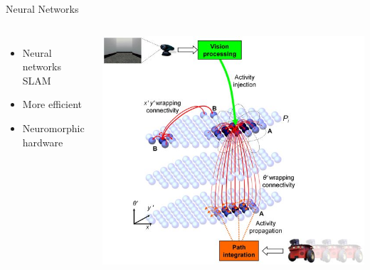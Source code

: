 \documentclass[17pt,mathserif]{beamer}
\begin{document}
        
    \begin{frame}{Neural Networks}{}
      \vspace*{-3em}        
      \begin{columns}
        \begin{itemize}
          \item Neural networks SLAM\cite{rat-slam}
          \item More efficient
          \item Neuromorphic hardware 
        \end{itemize}
        \hspace*{-1em}
        \vspace*{-1em}
        \includegraphics[width=1.4\textwidth]{ratslam}
      \end{columns}
    \end{frame}
            
\end{document}
